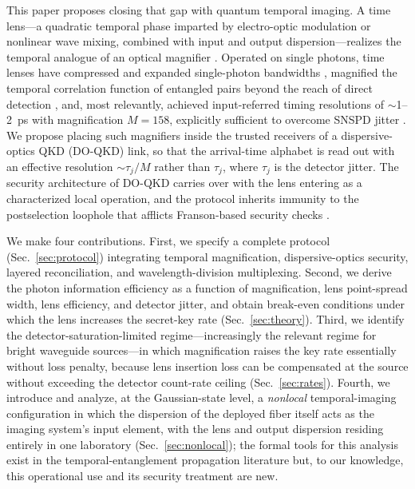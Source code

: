 \documentclass[11pt]{article}
\begin{document}
This paper proposes closing that gap with quantum temporal imaging. A time lens---a quadratic temporal phase imparted by electro-optic modulation or nonlinear wave mixing, combined with input and output dispersion---realizes the temporal analogue of an optical magnifier \cite{KolnerNazarathy1989,Kolner1994,Salem2013}. Operated on single photons, time lenses have compressed and expanded single-photon bandwidths \cite{Karpinski2017,Donohue2016}, magnified the temporal correlation function of entangled pairs beyond the reach of direct detection \cite{Mittal2017}, and, most relevantly, achieved input-referred timing resolutions of $\sim$1--2~ps with magnification $M = 158$, explicitly sufficient to overcome SNSPD jitter \cite{Joshi2022}. We propose placing such magnifiers inside the trusted receivers of a dispersive-optics QKD (DO-QKD) link, so that the arrival-time alphabet is read out with an effective resolution $\sim \tau_j / M$ rather than $\tau_j$, where $\tau_j$ is the detector jitter. The security architecture of DO-QKD carries over with the lens entering as a characterized local operation, and the protocol inherits immunity to the postselection loophole that afflicts Franson-based security checks \cite{Aerts1999,Jogenfors2015}.

We make four contributions. First, we specify a complete protocol (Sec.~\ref{sec:protocol}) integrating temporal magnification, dispersive-optics security, layered reconciliation, and wavelength-division multiplexing. Second, we derive the photon information efficiency as a function of magnification, lens point-spread width, lens efficiency, and detector jitter, and obtain break-even conditions under which the lens increases the secret-key rate (Sec.~\ref{sec:theory}). Third, we identify the detector-saturation-limited regime---increasingly the relevant regime for bright waveguide sources---in which magnification raises the key rate essentially without loss penalty, because lens insertion loss can be compensated at the source without exceeding the detector count-rate ceiling (Sec.~\ref{sec:rates}). Fourth, we introduce and analyze, at the Gaussian-state level, a \emph{nonlocal} temporal-imaging configuration in which the dispersion of the deployed fiber itself acts as the imaging system's input element, with the lens and output dispersion residing entirely in one laboratory (Sec.~\ref{sec:nonlocal}); the formal tools for this analysis exist in the temporal-entanglement propagation literature \cite{TsangPsaltis2006,Patera2017} but, to our knowledge, this operational use and its security treatment are new.
\end{document}
